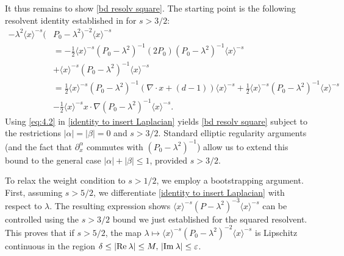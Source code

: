 \documentclass[11pt]{amsart}
\numberwithin{equation}{section}
\def\Re{{\rm Re}\:}
\def\Im{{\rm Im}\:}
\begin{document}
It thus remains to show \eqref{bd resolv square}. The starting point is the following resolvent identity established in \cite[Appendix E]{kn:llst25} for $s > 3/2$:
\begin{equation} \label{identity to insert Laplacian}
\begin{split}
-\lambda^2 \langle x \rangle^{-s} (&P_0 - \lambda^2)^{-2} \langle x \rangle^{-s} \\
&= - \tfrac{1}{2} \langle x \rangle^{-s} (P_0 - \lambda^2)^{-1}(2P_0) (P_0 - \lambda^2)^{-1} \langle x \rangle^{-s}  \\
& +\langle x \rangle^{-s} (P_0 - \lambda^2)^{-1} \langle x \rangle^{-s}\\
&=  \frac{1}{2} \langle x \rangle^{-s} (P_0 - \lambda^2)^{-1} (\nabla \cdot x  + (d-1))\langle x \rangle^{-s}  + \frac{1}{2} \langle x \rangle^{-s} (P_0 - \lambda^2)^{-1}  \langle x \rangle^{-s}\\
& -\frac{1}{2}  \langle x \rangle^{-s} x \cdot  \nabla (P_0 - \lambda^2)^{-1}  \langle x \rangle^{-s}. 
\end{split} 
\end{equation}
Using \eqref{eq:4.2} in \eqref{identity to insert Laplacian} yields \eqref{bd resolv square} subject to the restrictions $|\alpha| = |\beta| = 0$ and $s > 3/2$. Standard elliptic regularity arguments (and the fact that $\partial^\alpha_x$ commutes with $(P_0 - \lambda^2)^{-1}$) allow us to extend this bound to the general case $|\alpha| + |\beta| \le 1$, provided $s > 3/2$.

To relax the weight condition to $s > 1/2$, we employ a bootstrapping argument. First, assuming $s > 5/2$, we differentiate \eqref{identity to insert Laplacian} with respect to $\lambda$. The resulting expression shows $\langle x \rangle^{-s} (P - \lambda^2)^{-3} \langle x \rangle^{-s}$ can be controlled using the $s > 3/2$ bound we just established for the squared resolvent. This proves that if $s > 5/2$, the map $\lambda \mapsto \langle x \rangle^{-s} (P_0 - \lambda^2)^{-2} \langle x \rangle^{-s}$ is Lipschitz continuous in the region $\delta \le |\Re \lambda| \le M, \,  |\Im \lambda | \le \varepsilon$.
\end{document}
